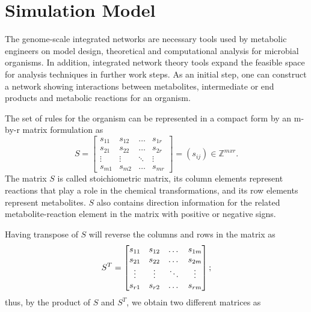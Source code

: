 \section{Simulation Model}
The genome-scale integrated networks are necessary tools used by metabolic engineers on model design, theoretical and computational analysis for microbial organisms. In addition, integrated network theory tools expand the feasible space for analysis techniques in further work steps. As an initial step, one can construct a network showing interactions between metabolites, intermediate or end products and metabolic reactions for an organism. 

The set of rules for the organism can be represented in a compact form by an m-by-r matrix formulation as
\begin{equation} %
	S =  \begin{bmatrix} 
		s_{11} & s_{12} & \dots  & s_{1r}\\
		s_{21} & s_{22} & \dots  & s_{2r}\\
		\vdots & \vdots &\ddots & \vdots \\
		s_{m1} & s_{m2} & \dots & s_{mr} 
	\end{bmatrix}=(s_{ij})\in \mathbb{Z}^{mxr}.
	\label{stoichio}
\end{equation}
The matrix $S$ is called stoichiometric matrix, its column elements represent reactions that play a role in the chemical transformations, and its row elements represent metabolites. $S$ also contains direction information for the related metabolite-reaction element in the matrix with positive or negative signs.~\cite{klipp2005systems} 

Having transpose of $S$ will reverse the columns and rows in the matrix as 
\begin{equation}
	S^{T} =  \begin{bmatrix} 
		s_{11} & s_{12} & \dots  & s_{1m}\\
		s_{21} & s_{22} & \dots  & s_{2m}\\
		\vdots & \vdots &\ddots & \vdots \\
		s_{r1} & s_{r2} & \dots & s_{rm} 
	\end{bmatrix};
	\notag
\end{equation}
thus, by the product of $S$ and $S^{T}$, we obtain two different matrices as

